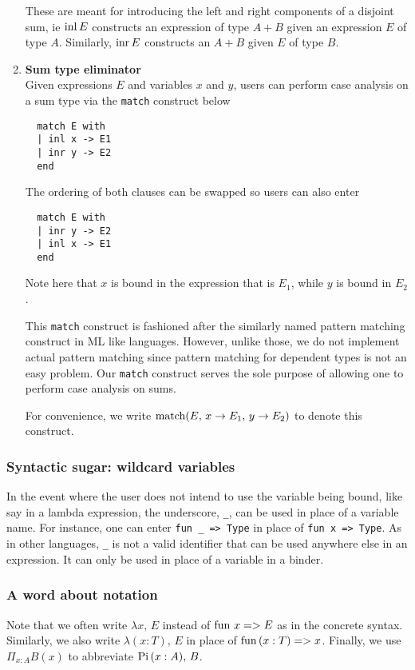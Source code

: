 \documentclass{article}
\begin{document}
\begin{enumerate}
These are meant for introducing the left and right components of a disjoint sum,
ie $\operatorname{inl} E$ constructs an expression of type $A + B$ given an expression $E$ of
type $A$. Similarly, $\operatorname{inr} E$ constructs an $A + B$ given $E$ of type $B$.

\item \textbf{Sum type eliminator} \\
Given expressions $E$ and variables $x$ and $y$, users can perform case analysis
on a sum type via the \verb|match| construct below

\begin{verbatim}
  match E with
  | inl x -> E1
  | inr y -> E2
  end
\end{verbatim}

The ordering of both clauses can be swapped so users can also enter
\begin{verbatim}
  match E with
  | inr y -> E2
  | inl x -> E1
  end
\end{verbatim}

Note here that $x$ is bound in the expression that is $E_1$, while $y$ is bound
in $E_2$.

This \verb|match| construct is fashioned after the similarly named pattern
matching construct in ML like languages.
However, unlike those, we do not implement actual pattern matching since pattern
matching for dependent types is not an easy problem.
Our \verb|match| construct serves the sole purpose of allowing one to perform
case analysis on sums.

For convenience, we write 
$\operatorname{match}(E, \, x \rightarrow E_1, \, y \rightarrow E_2)$ to denote this
construct.

\end{enumerate}

\subsubsection{Syntactic sugar: wildcard variables}
In the event where the user does not intend to use the variable being bound,
like say in a lambda expression, the underscore, \verb|_|, can be used in place
of a variable name.
For instance, one can enter \verb|fun _ => Type| in place of \verb|fun x => Type|.
As in other languages, \verb|_| is not a valid identifier that can be used
anywhere else in an expression. It can only be used in place of a variable in a
binder.

\subsubsection{A word about notation}
Note that we often write $\lambda x, \, E$ instead of $\operatorname{fun} \, x => E$ as in the
concrete syntax. Similarly, we also write $\lambda (x : T), \, E$ in place of
$\operatorname{fun} \, (x : T) => x$.
Finally, we use $\Pi_{x : A}B(x)$ to abbreviate $\operatorname{Pi} \, (x : A), \, B$.
\end{document}

